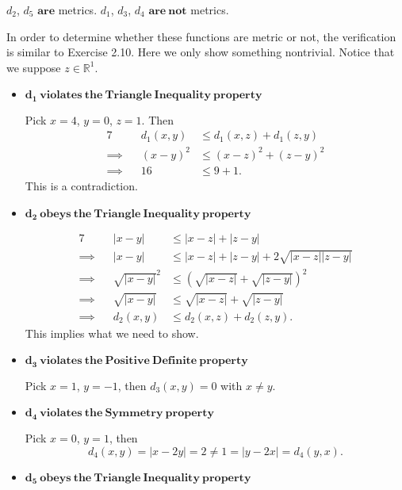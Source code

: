 \begin{Exercise}
\begin{answer}
$d_2$, $d_5$ $\mathbf{are}$ metrics.
$d_1$, $d_3$, $d_4$ $\mathbf{are\ not}$ metrics.
\end{answer}
\begin{solution}
In order to determine whether these functions are metric or not, the verification is similar to Exercise 2.10. Here we only show something nontrivial. Notice that we suppose $z\in\mathbb{R}^1$.

\begin{itemize}
\item $\mathbf{d_1\ violates\ the\ Triangle\ Inequality \ property}$

Pick $x=4$, $y=0$, $z=1$. Then
\begin{alignat*}{7}
\quad&& d_1(x,y) &\leq d_1(x,z) + d_1(z,y) \\
\implies&& (x-y)^2 &\leq (x-z)^2 + (z-y)^2 \\
\implies&& 16 &\leq 9 + 1.
\end{alignat*}
This is a contradiction.

\item $\mathbf{d_2\ obeys\ the\ Triangle\ Inequality\ property}$

\begin{alignat*}{7}
\quad&& |x-y| &\leq |x-z| + |z-y| \\
\implies&& |x-y| &\leq |x-z| + |z-y| + 2\sqrt{|x-z| |z-y|} \\
\implies&& \sqrt{|x-y|}^2 &\leq \left( \sqrt{|x-z|} + \sqrt{|z-y|} \right)^2 \\
\implies&& \sqrt{|x-y|} &\leq \sqrt{|x-z|} + \sqrt{|z-y|} \\
\implies&& d_2(x,y) &\leq d_2(x,z) + d_2(z,y).
\end{alignat*}
This implies what we need to show.

\item $\mathbf{d_3\ violates\ the\ Positive\ Definite\ property}$

Pick $x=1$, $y=-1$, then $d_3(x,y) = 0$ with $x\neq y$.

\item $\mathbf{d_4\ violates\ the\ Symmetry\ property}$

Pick $x=0$, $y=1$, then
$$
d_4(x,y) = |x-2y| = 2 \neq 1 = |y-2x| = d_4(y,x).
$$

\item $\mathbf{d_5\ obeys\ the\ Triangle\ Inequality\ property}$


\end{itemize}
\end{solution}
\end{Exercise}
